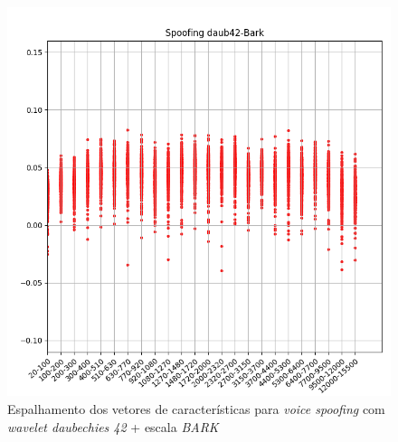 		\begin{figure}[h]
			\centering
			\includegraphics[width=\linewidth]{images/results/barkVersusMel/spoofingDaub42Bark}
			\caption{Espalhamento dos vetores de características para \textit{voice spoofing} com \textit{wavelet daubechies 42} + escala \textit{BARK} }
			\label{fig:spoofingdaub42bark}
		\end{figure}



